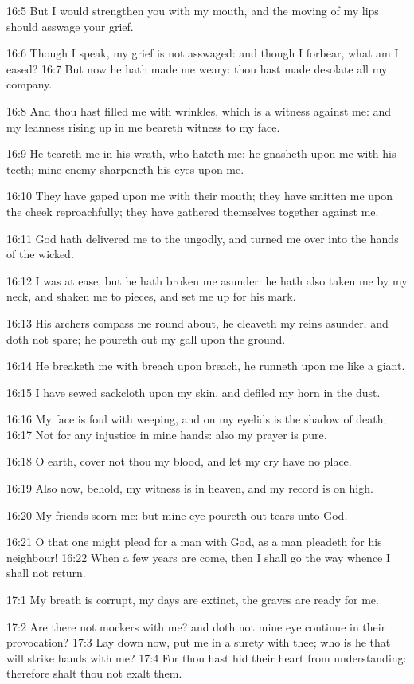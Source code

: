 16:5 But I would strengthen you with my mouth, and the moving of my lips should asswage your grief.

16:6 Though I speak, my grief is not asswaged: and though I forbear, what am I eased?  16:7 But now he hath made me weary: thou hast made desolate all my company.

16:8 And thou hast filled me with wrinkles, which is a witness against me: and my leanness rising up in me beareth witness to my face.

16:9 He teareth me in his wrath, who hateth me: he gnasheth upon me with his teeth; mine enemy sharpeneth his eyes upon me.

16:10 They have gaped upon me with their mouth; they have smitten me upon the cheek reproachfully; they have gathered themselves together against me.

16:11 God hath delivered me to the ungodly, and turned me over into the hands of the wicked.

16:12 I was at ease, but he hath broken me asunder: he hath also taken me by my neck, and shaken me to pieces, and set me up for his mark.

16:13 His archers compass me round about, he cleaveth my reins asunder, and doth not spare; he poureth out my gall upon the ground.

16:14 He breaketh me with breach upon breach, he runneth upon me like a giant.

16:15 I have sewed sackcloth upon my skin, and defiled my horn in the dust.

16:16 My face is foul with weeping, and on my eyelids is the shadow of death; 16:17 Not for any injustice in mine hands: also my prayer is pure.

16:18 O earth, cover not thou my blood, and let my cry have no place.

16:19 Also now, behold, my witness is in heaven, and my record is on high.

16:20 My friends scorn me: but mine eye poureth out tears unto God.

16:21 O that one might plead for a man with God, as a man pleadeth for his neighbour!  16:22 When a few years are come, then I shall go the way whence I shall not return.

17:1 My breath is corrupt, my days are extinct, the graves are ready for me.

17:2 Are there not mockers with me? and doth not mine eye continue in their provocation?  17:3 Lay down now, put me in a surety with thee; who is he that will strike hands with me?  17:4 For thou hast hid their heart from understanding: therefore shalt thou not exalt them.

